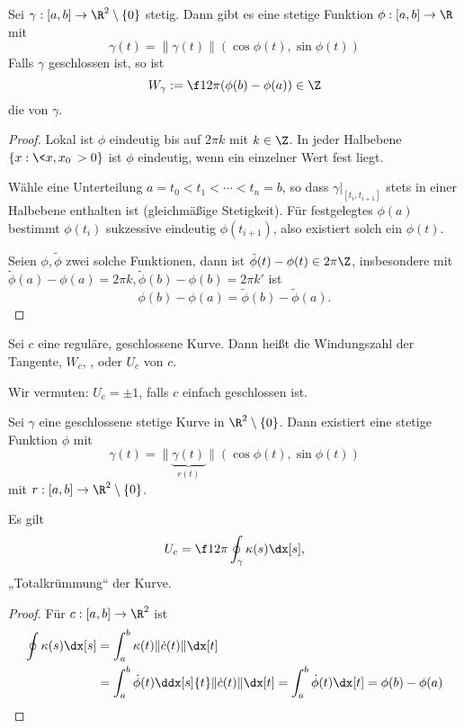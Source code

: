 \begin{lem}
	Sei $\gamma: [a,b] \to \R^2 \setminus \{0\}$ stetig.
	Dann gibt es eine stetige Funktion $\phi: [a,b] \to \R$ mit
	\[
		\gamma(t) = \| \gamma(t) \| (\cos \phi(t), \sin \phi(t))
	\]
	Falls $\gamma$ geschlossen ist, so ist
	\[
		W_\gamma := \f 1{2\pi} (\phi(b) - \phi(a)) \in \Z
	\]
	die  von $\gamma$.
	\begin{proof}
		Lokal ist $\phi$ eindeutig bis auf $2\pi k$ mit $k \in \Z$.
		In jeder Halbebene $\{ x : \<x, x_0\> > 0 \}$ ist $\phi$ eindeutig, wenn ein einzelner Wert fest liegt.

		Wähle eine Unterteilung $a = t_0 < t_1 < \dotsb < t_n = b$, so dass $\gamma|_{[t_i, t_{i+1}]}$ stets in einer Halbebene enthalten ist (gleichmäßige Stetigkeit).
		Für festgelegtes $\phi(a)$ bestimmt $\phi(t_{i})$ sukzessive eindeutig $\phi(t_{i+1})$, also existiert solch ein $\phi(t)$.

		Seien $\phi, \tilde \phi$ zwei solche Funktionen, dann ist $\tilde \phi(t) - \phi(t) \in 2\pi\Z$, insbesondere mit $\tilde \phi(a) - \phi(a) = 2\pi k, \tilde \phi(b) - \phi(b) = 2 \pi k'$ ist
		\[
			\phi(b) - \phi(a) = \tilde \phi(b) - \tilde \phi(a).
		\]
	\end{proof}
\end{lem}

\begin{df}
	Sei $c$ eine reguläre, geschlossene Kurve.
	Dann heißt die Windungszahl der Tangente, $W_{\dot c}$, , oder  $U_c$ von $c$.
\end{df}

Wir vermuten: $U_c = \pm 1$, falls $c$ einfach geschlossen ist.



Sei $\gamma$ eine geschlossene stetige Kurve in $\R^2 \setminus \{0\}$.
Dann existiert eine stetige Funktion $\phi$ mit
\[
	\gamma(t) = \| \underbrace{\gamma(t)}_{r(t)} \| ( \cos \phi(t), \sin \phi(t) )
\]
mit $r:[a,b] \to \R^2 \setminus \{0\}$.


\begin{prop}
	Es gilt
	\[
		U_c = \f 1{2\pi} \oint_{\gamma} \kappa(s) \dx[s],
	\]
	„Totalkrümmung“ der Kurve.
	\begin{proof}
		Für $c: [a,b] \to \R^2$ ist
		\begin{align*}
			\oint \kappa(s)\dx[s]
			&= \int_a^b \kappa(t) \|\dot c(t)\| \dx[t] \\
			&= \int_a^b \dot \phi(t) \ddx[s]{t} \|\dot c(t)\| \dx[t]
			= \int_a^b \dot \phi(t) \dx[t]
			= \phi(b) - \phi(a)
		\end{align*}
	\end{proof}
\end{prop}

